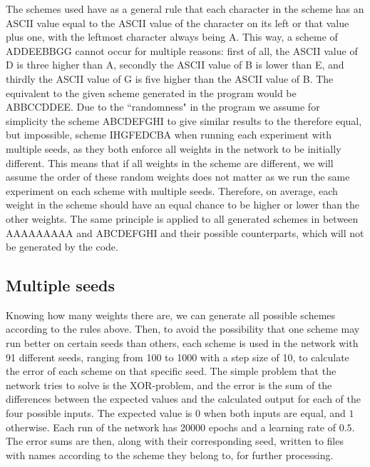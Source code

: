 \documentclass[a4paper, 10pt, notitlepage, twocolumn]{article}
\begin{document}
      The schemes used have as a general rule that each character in the scheme has an ASCII value equal to the ASCII value of the character on its left or that value plus one,  with the leftmost character always being A. This way,  a scheme of ADDEEBBGG cannot occur for multiple reasons: first of all,  the ASCII value of D is three higher than A,  secondly the ASCII value of B is lower than E,  and thirdly the ASCII value of G is five higher than the ASCII value of B. The equivalent to the given scheme generated in the program would be ABBCCDDEE. Due to the ``randomness" in the program we assume for simplicity the scheme ABCDEFGHI to give similar results to the therefore equal,  but impossible,  scheme IHGFEDCBA when running each experiment with multiple seeds,  as they both enforce all weights in the network to be initially different. This means that if all weights in the scheme are different,  we will assume the order of these random weights does not matter as we run the same experiment on each scheme with multiple seeds. Therefore,  on average,  each weight in the scheme should have an equal chance to be higher or lower than the other weights. The same principle is applied to all generated schemes in between AAAAAAAAA and ABCDEFGHI and their possible counterparts,  which will not be generated by the code.
   \subsection{Multiple seeds}
      Knowing how many weights there are,  we can generate all possible schemes according to the rules above. Then,  to avoid the possibility that one scheme may run better on certain seeds than others,  each scheme is used in the network with 91 different seeds,  ranging from 100 to 1000 with a step size of 10,  to calculate the error of each scheme on that specific seed. The simple problem that the network tries to solve is the XOR-problem,  and the error is the sum of the differences between the expected values and the calculated output for each of the four possible inputs. The expected value is $0$ when both inputs are equal,  and $1$ otherwise. Each run of the network has 20000 epochs and a learning rate of $0.5$. The error sums are then,  along with their corresponding seed,  written to files with names according to the scheme they belong to,  for further processing.
 
\end{document}

